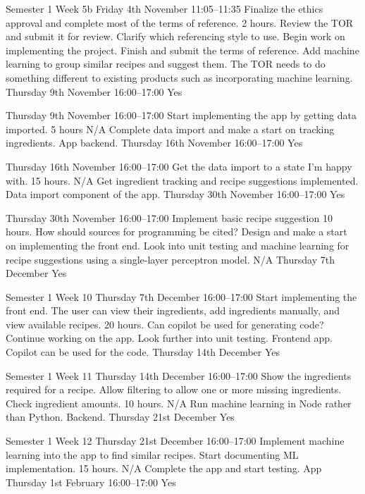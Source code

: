 \documentclass[../CHEFCookingHelper.tex]{subfiles}
\begin{document}
\logbookentry
{Semester 1 Week 5b}
{Friday 4th November 11:05--11:35}
{Finalize the ethics approval and complete most of the terms of reference.}
{2 hours.}
{Review the TOR and submit it for review. Clarify which referencing style to use. Begin work on implementing the project.}
{Finish and submit the terms of reference. Add machine learning to group similar recipes and suggest them.}
{The TOR needs to do something different to existing products such as incorporating machine learning.}
{Thursday 9th November 16:00--17:00}
{Yes}

{Thursday 9th November 16:00--17:00}
{Start implementing the app by getting data imported.}
{5 hours}
{N/A}
{Complete data import and make a start on tracking ingredients.}
{App backend.}
{Thursday 16th November 16:00--17:00}
{Yes}

{Thursday 16th November 16:00--17:00}
{Get the data import to a state I'm happy with.}
{15 hours.}
{N/A}
{Get ingredient tracking and recipe suggestions implemented.}
{Data import component of the app.}
{Thursday 30th November 16:00--17:00}
{Yes}

{Thursday 30th November 16:00--17:00}
{Implement basic recipe suggestion}
{10 hours.}
{How should sources for programming be cited?}
{Design and make a start on implementing the front end. Look into unit testing and machine learning for recipe suggestions using a single-layer perceptron model.}
{N/A}
{Thursday 7th December}
{Yes}

\logbookentry
{Semester 1 Week 10}
{Thursday 7th December 16:00--17:00}
{Start implementing the front end. The user can view their ingredients, add ingredients manually, and view available recipes.}
{20 hours.}
{Can copilot be used for generating code?}
{Continue working on the app. Look further into unit testing.}
{Frontend app. Copilot can be used for the code.}
{Thursday 14th December}
{Yes}

\logbookentry
{Semester 1 Week 11}
{Thursday 14th December 16:00--17:00}
{Show the ingredients required for a recipe. Allow filtering to allow one or more missing ingredients. Check ingredient amounts.}
{10 hours.}
{N/A}
{Run machine learning in Node rather than Python.}
{Backend.}
{Thursday 21st December}
{Yes}

\logbookentry
{Semester 1 Week 12}
{Thursday 21st December 16:00--17:00}
{Implement machine learning into the app to find similar recipes. Start documenting ML implementation.}
{15 hours.}
{N/A}
{Complete the app and start testing.}
{App}
{Thursday 1st February 16:00--17:00}
{Yes}
\end{document}

